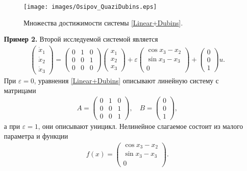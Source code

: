 \documentclass[../main.tex]{subfiles}
\begin{document}
\begin{figure}[ht]
    \centerline{
        \texttt{[image: images/Osipov\_QuaziDubins.eps]}}
    \caption{Множества достижимости системы \eqref{Linear+Dubins}.}
    \label{fig:LinearDubins}
\end{figure}
\textbf{Пример 2.}
    Второй исследуемой системой является
    \begin{gather}\label{Linear+Dubins}
        \begin{pmatrix} 
            \dot{x}_1 \\
            \dot{x}_2 \\ 
            \dot{x}_3 \end{pmatrix} = 
        \begin{pmatrix}
            0 & 1 & 0 \\
            0 & 0 & 1 \\
            0 & 0 & 0
        \end{pmatrix}
        \begin{pmatrix} 
            x_1 \\
            x_2 \\ 
            x_3 \end{pmatrix} + 
        \varepsilon
        \begin{pmatrix}
            \cos x_3 - x_2\\
            \sin x_3 - x_3 \\
            0
        \end{pmatrix} + 
        \begin{pmatrix}
            0 \\ 0 \\ 1
        \end{pmatrix} u.
    \end{gather}
    При $\varepsilon = 0$, уравнения \eqref{Linear+Dubins} описывают линейную систему с матрицами 
    \begin{gather*}
        A = \begin{pmatrix} 0 & 1 & 0\\
            0 & 0 & 1\\ 
            0 & 0 & 1 
        \end{pmatrix}, \quad B = \begin{pmatrix}
            0\\
            0\\
            1
        \end{pmatrix},
    \end{gather*}
    а при $\varepsilon = 1$, они описывают уницикл. 
    Нелинейное слагаемое состоит из малого параметра и функции
    \begin{gather*}
        f(x) = \begin{pmatrix}
            \cos x_3 - x_2\\
            \sin x_3 - x_3 \\
            0
        \end{pmatrix}.
    \end{gather*}
    
\end{document}
